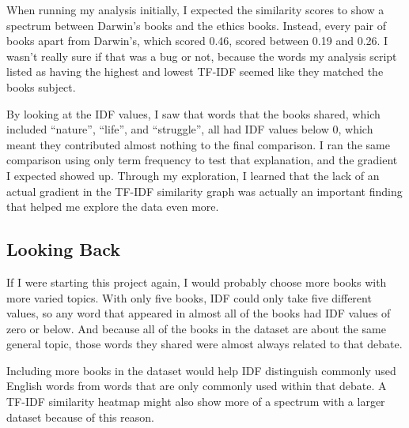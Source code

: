 \documentclass[11pt]{article}
\begin{document}
When running my analysis initially, I expected the similarity scores to show a spectrum between Darwin's books and the ethics books.
Instead, every pair of books apart from Darwin's, which scored 0.46, scored between 0.19 and 0.26.
I wasn't really sure if that was a bug or not, because the words my analysis script listed as having the highest and lowest TF-IDF seemed like they matched the books subject.

By looking at the IDF values, I saw that words that the books shared, which included ``nature'', ``life'', and ``struggle'', all had IDF values below 0, which meant they contributed almost nothing to the final comparison.
I ran the same comparison using only term frequency to test that explanation, and the gradient I expected showed up.
Through my exploration, I learned that the lack of an actual gradient in the TF-IDF similarity graph was actually an important finding that helped me explore the data even more.

\subsection{Looking Back}

If I were starting this project again, I would probably choose more books with more varied topics.
With only five books, IDF could only take five different values, so any word that appeared in almost all of the books had IDF values of zero or below.
And because all of the books in the dataset are about the same general topic, those words they shared were almost always related to that debate.

Including more books in the dataset would help IDF distinguish commonly used English words from words that are only commonly used within that debate.
A TF-IDF similarity heatmap might also show more of a spectrum with a larger dataset because of this reason.



\nocite{*}
\end{document}
